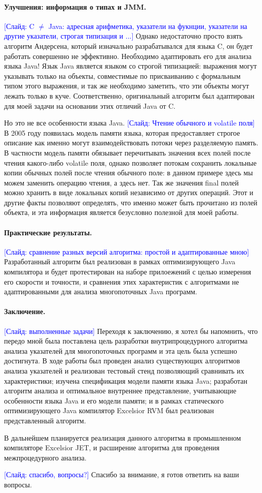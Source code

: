 \documentclass[12pt]{article}
\newcommand{\slide}[1]{\textcolor{Blue}{[Слайд: #1]}}
\newcommand{\eng}[1]{{\English#1}}
\begin{document}
  \paragraph{Улучшения: информация о типах и JMM.}
  \slide{C $\neq$ Java: адресная арифметика, указатели на фукнции, указатели на
  другие указатели, строгая типизация и ...}
  Однако недостаточно просто взять алгоритм Андерсена, который изначально
  разрабатывался для языка C, он будет работать совершенно не эффективно.
  Необходимо адаптировать его для анализа языка Java! Язык Java является языком
  со строгой типизацией: выражения могут указывать только на объекты,
  совместимые по присваиванию с формальным типом этого выражения, и так же
  необходимо заметить, что эти объекты могут лежать только в куче.
  Соответственно, оригинальный алгоритм был адаптирован для моей задачи на
  основании этих отличий Java от C.

  Но это не все особенности языка Java.
  \slide{Чтение обычного и \eng{volatile} поля}
  В 2005 году появилась модель памяти языка, которая предоставляет строгое
  описание как именно могут взаимодействовать потоки через разделяемую память.
  В частности модель памяти обязывает перечитывать значения всех полей после
  чтения какого-либо \eng{volatile} поля, однако позволяет потокам сохранить
  локальные копии обычных полей после чтения обычного поле: в данном примере
  здесь мы можем заменить операцию чтения, а здесь нет. Так же значения
  \eng{final} полей можно хранить в виде локальных копий независимо от других
  операций. Этот и другие факты позволяют определять, что именно может быть
  прочитано из полей объекта, и эта информация является безусловно полезной для
  моей работы.

  \paragraph{Практические результаты.}
  \slide{сравнение разных версий алгоритма: простой и адаптированные мною}
  Разработанный алгоритм был реализован в рамках оптимизирующего Java
  компилятора и будет протестирован на наборе прилоежений с целью измерения его
  скорости и точности, и сравнения этих характеристик с алгоритмами не
  адаптированными для анализа многопоточных Java программ.

  \paragraph{Заключение.}
  \slide{выполненные задачи}
  Переходя к заключению, я хотел бы напомнить, что передо мной была поставлена
  цель разработки внутрипроцедурного алгоритма анализа указателей для
  многопоточных программ и эта цель была успешно достигнута.
  В ходе работы был
  проведен анализ существующих алгоритмов анализа указателей и реализован
  тестовый стенд позволяющий сравнивать их характеристики;
  изучена спецификация модели памяти языка Java;
  разработан алгоритм анализа и оптимальное внутреннее представление,
  учитывающие особенности языка Java и его модели памяти;
  и в рамках статического оптимизирующего Java компилятор Excelsior RVM
  был реализован представленный алгоритм.

  В дальнейшем планируется реализация данного алгоритма в промышленном
  компиляторе Excelsior JET, и расширение алгоритма для проведения
  межпроцедурного анализа.

  \slide{спасибо, вопросы?}
  Спасибо за внимание, я готов ответить на ваши вопросы.
\end{document}
